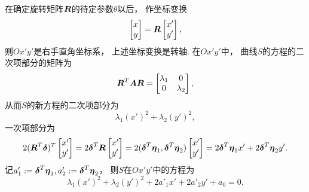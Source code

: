 在确定旋转矩阵\(\boldsymbol{R}\)的待定参数\(\theta\)以后，
作坐标变换\begin{equation}\label{equation:二次曲线方程的化简及其类型.转轴变换}
	\begin{bmatrix}
		x \\ y
	\end{bmatrix}
	= \boldsymbol{R}
	\begin{bmatrix}
		x' \\ y'
	\end{bmatrix},
\end{equation}
则\(Ox'y'\)是右手直角坐标系，
上述坐标变换是转轴.
在\(Ox'y'\)中，
曲线\(S\)的方程的二次项部分的矩阵为\begin{equation*}
	\boldsymbol{R}^T \boldsymbol{A} \boldsymbol{R}
	= \begin{bmatrix}
		\lambda_1 & 0 \\
		0 & \lambda_2
	\end{bmatrix},
\end{equation*}
从而\(S\)的新方程的二次项部分为\begin{equation*}
	\lambda_1 (x')^2 + \lambda_2 (y')^2,
\end{equation*}
一次项部分为\begin{equation*}
	2 (\boldsymbol{R}^T \boldsymbol\delta)^T
	\begin{bmatrix}
		x' \\ y'
	\end{bmatrix}
	= 2 \boldsymbol\delta^T \boldsymbol{R}
	\begin{bmatrix}
		x' \\ y'
	\end{bmatrix}
	= 2 (\boldsymbol\delta^T \boldsymbol\eta_1,\boldsymbol\delta^T \boldsymbol\eta_2)
	\begin{bmatrix}
		x' \\ y'
	\end{bmatrix}
	= 2 \boldsymbol\delta^T \boldsymbol\eta_1 x'
		+ 2 \boldsymbol\delta^T \boldsymbol\eta_2 y'.
\end{equation*}
记\(
	a'_1 := \boldsymbol\delta^T \boldsymbol\eta_1,
	a'_2 := \boldsymbol\delta^T \boldsymbol\eta_2
\)，
则\(S\)在\(Ox'y'\)中的方程为\begin{equation}\label{equation:二次曲线方程的化简及其类型.转轴后所得方程}
	\lambda_1 (x')^2 + \lambda_2 (y')^2 + 2 a'_1 x' + 2 a'_2 y' + a_ 0 = 0.
\end{equation}


